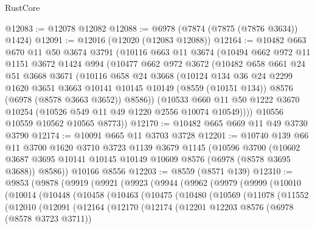 \begin{lexlean}{RustCore}
\begin{coremodule}
@12083 := @12078 @12082
@12088 := @6978 (@7874 (@7875 (@7876 @3634)) @1424)
@12091 := @12016 (@12020 (@12083 @12088))
@12164 := @10482
    @663
    @670
    @11
    @50
    @3674
    @3791
    (@10116
      @663
      @11
      @3674
      (@10494
        @662
        @972
        @11
        @1151
        @3672
        @1424
        @994
        (@10477
          @662
          @972
          @3672
          (@10482
            @658
            @661
            @24
            @51
            @3668
            @3671
            (@10116
              @658
              @24
              @3668
              (@10124
                @134
                @36
                @24
                @2299
                @1620
                @3651
                @3663
                @10141
                @10145
                @10149
                (@8559 (@10151 @134))
                @8576
                (@6978 (@8578 @3663 @3652))
                @8586))
            (@10533
              @660
              @11
              @50
              @1222
              @3670
              @10254
              (@10526 @549 @11 @49 @1220 @2556 @10074 @10549))))
        @10556
        @10559
        @10562
        @10565
        @8773))
@12170 := @10482 @665 @669 @11 @49 @3730 @3790
@12174 := @10091 @665 @11 @3703 @3728
@12201 := @10740
    @139
    @66
    @11
    @3700
    @1620
    @3710
    @3723
    @1139
    @3679
    @1145
    (@10596
      @3700
      (@10602 @3687 @3695 @10141 @10145 @10149 @10609 @8576 (@6978 (@8578 @3695 @3688)) @8586))
    @10166
    @8556
@12203 := @8559 (@8571 @139)
@12310 := @9853
    (@9878
      (@9919
        (@9921
          (@9923
            (@9944
              (@9962
                (@9979
                  (@9999
                    (@10010
                      (@10014
                        (@10448
                          (@10458
                            (@10463
                              (@10475
                                (@10480
                                  (@10569
                                    (@11078
                                      (@11552
                                        (@12010
                                          (@12091
                                            (@12164
                                              (@12170
                                                (@12174
                                                  (@12201
                                                    @12203
                                                    @8576
                                                    (@6978 (@8578 @3723 @3711))

\end{coremodule}
\end{lexlean}
